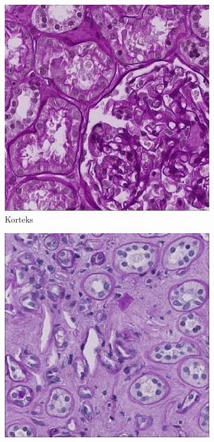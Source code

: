 \begin{figure}[H]
	\centering
	\begin{subfigure}[b]{0.3\textwidth}
		\centering
		\includegraphics[width=\textwidth]{gambar/korteks.png}
		\caption{Korteks}
		\label{fig:korteks}
	\end{subfigure}
	\hfill
	\begin{subfigure}[b]{0.3\textwidth}
		\centering
		\includegraphics[width=\textwidth]{gambar/medula.png}

\end{subfigure}
\end{figure}
